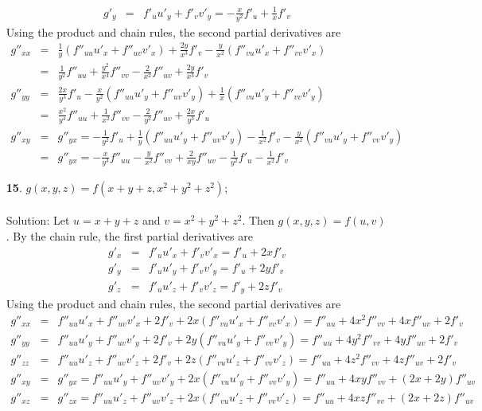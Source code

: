 \documentclass[12pt]{amsbook}
\begin{document}
\begin{enumerate}
\begin{eqnarray*}
g'_y&=&f'_uu'_y+f'_vv'_y=-\frac{x}{y^2}f'_u+\frac{1}{x}f'_v
\end{eqnarray*}
Using the product and chain rules, the second partial derivatives are
\begin{eqnarray*}
g''_{xx}&=&\frac{1}{y}(f''_{uu}u'_x+f''_{uv}v'_x)+\frac{2y}{x^3}f'_v-\frac{y}{x^2}(f''_{vu}u'_x+f''_{vv}v'_x) \\
&=&\frac{1}{y^2}f''_{uu}+\frac{y^2}{x^4}f''_{vv}-\frac{2}{x^2}f''_{uv}+\frac{2y}{x^3}f'_v \\
g''_{yy}&=&\frac{2x}{y^3}f'_u-\frac{x}{y^2}(f''_{uu}u'_y+f''_{uv}v'_y)+\frac{1}{x}(f''_{vu}u'_y+f''_{vv}v'_y) \\
&=&\frac{x^2}{y^4}f''_{uu}+\frac{1}{x^2}f''_{vv}-\frac{2}{y^2}f''_{uv}+\frac{2x}{y^3}f'_u \\
g''_{xy}&=&g''_{yx}=-\frac{1}{y^2}f'_u+\frac{1}{y}(f''_{uu}u'_y+f''_{uv}v'_y)-\frac{1}{x^2}f'_v-\frac{y}{x^2}(f''_{vu}u'_y+f''_{vv}v'_y) \\
&=&g''_{yx}=-\frac{x}{y^3}f''_{uu}-\frac{y}{x^2}f''_{vv}+\frac{2}{xy}f''_{uv}-\frac{1}{y^2}f'_u-\frac{1}{x^2}f'_v
\end{eqnarray*}
\item[{\small\bf 15}.] $g(x,y,z)=f(x+y+z,x^2+y^2+z^2)$;
\\
\\
{\sc Solution}: Let $u=x+y+z$ and $v=x^2+y^2+z^2$. Then $g(x,y,z)=f(u,v)$. By the chain rule, the first partial derivatives are
\begin{eqnarray*}
g'_x&=&f'_uu'_x+f'_vv'_x=f'_u+2xf'_v \\
g'_y&=&f'_uu'_y+f'_vv'_y=f'_u+2yf'_v \\
g'_z&=&f'_uu'_z+f'_vv'_z=f'_y+2zf'_v
\end{eqnarray*}
Using the product and chain rules, the second partial derivatives are
\begin{eqnarray*}
g''_{xx}&=&f''_{uu}u'_x+f''_{uv}v'_x+2f'_v+2x(f''_{vu}u'_x+f''_{vv}v'_x)=f''_{uu}+4x^2f''_{vv}+4xf''_{uv}+2f'_v\\
g''_{yy}&=&f''_{uu}u'_y+f''_{uv}v'_y+2f'_v+2y(f''_{vu}u'_y+f''_{vv}v'_y)=f''_{uu}+4y^2f''_{vv}+4yf''_{uv}+2f'_v\\
g''_{zz}&=&f''_{uu}u'_z+f''_{uv}v'_z+2f'_v+2z(f''_{vu}u'_z+f''_{vv}v'_z)=f''_{uu}+4z^2f''_{vv}+4zf''_{uv}+2f'_v\\
g''_{xy}&=&g''_{yx}=f''_{uu}u'_y+f''_{uv}v'_y+2x(f''_{vu}u'_y+f''_{vv}v'_y)=f''_{uu}+4xyf''_{vv}+(2x+2y)f''_{uv}\\
g''_{xz}&=&g''_{zx}=f''_{uu}u'_z+f''_{uv}v'_z+2x(f''_{vu}u'_z+f''_{vv}v'_z)=f''_{uu}+4xzf''_{vv}+(2x+2z)f''_{uv}\\

\end{eqnarray*}
\end{enumerate}
\end{document}

